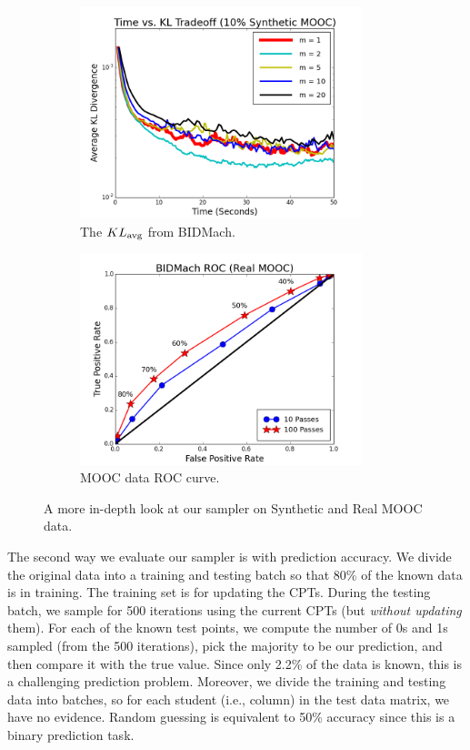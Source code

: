 \documentclass{article} %
\begin{document}
\begin{figure}[t]
\centering
\begin{subfigure}{.5\textwidth}
  \centering
  \includegraphics[width=0.9\textwidth]{fig_kltime_tradeoff_mooc}
  \caption{The $KL_{\rm avg}$ from BIDMach.}
  \label{fig:mooc_kl}
\end{subfigure}%
\begin{subfigure}{.5\textwidth}
  \centering
  \includegraphics[width=0.9\textwidth]{fig_bidmach_real_mooc_roc_curve}
  \caption{MOOC data ROC curve.}
  \label{fig:mooc_accuracy}
\end{subfigure}
\caption{A more in-depth look at our sampler on Synthetic and Real MOOC data.}
\label{fig:third_set}
\end{figure}


The second way we evaluate our sampler is with prediction accuracy. We divide the original
data into a training and testing batch so that 80\% of the known data is in training. The training
set is for updating the CPTs. During the testing batch, we sample for 500 iterations using the
current CPTs (but \emph{without updating} them). For each of the known test points, we compute the
number of 0s and 1s sampled (from the 500 iterations), pick the majority to be our prediction,
and then compare it with the true value. Since only 2.2\% of the data is known, this is a challenging
prediction problem. Moreover, we divide the training and testing data into batches, so for each
student (i.e., column) in the test data matrix, we have no evidence.  Random guessing is equivalent
to 50\% accuracy since this is a binary prediction task.
\end{document}
